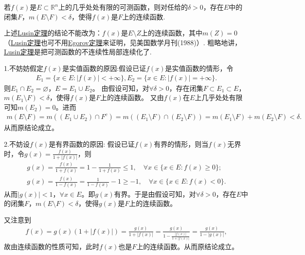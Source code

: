 \documentclass[../../main.tex]{subfiles}
\begin{document}
\begin{theorem}[Lusin(卢津)定理]\label{theorem:Lusin(卢津)定理}
若\(f(x)\)是\(E \subset \mathbb{R}^{n}\)上的几乎处处有限的可测函数，则对任给的\(\delta > 0\)，存在\(E\)中的闭集\(F\)，\(m(E \setminus F) < \delta\)，使得\(f(x)\)是\(F\)上的连续函数.
\end{theorem}
\begin{remark}
上述\hyperref[theorem:Lusin(卢津)定理]{Lusin定理}的结论不能改为：\(f(x)\)是\(E \setminus Z\)上的连续函数，其中\(m(Z) = 0\)（\hyperref[theorem:Lusin(卢津)定理]{Lusin定理}也可不用\hyperref[theorem:Egorov定理]{Egorov定理}来证明，见美国数学月刊(1988)）. 粗略地讲，\hyperref[theorem:Lusin(卢津)定理]{Lusin定理}是把可测函数的不连续性局部连续化了. 
\end{remark}
\begin{remark}
1.\hypertarget{不妨假定f是实值函数的原因}{不妨妨假定}\(f(x)\)是实值函数的原因:假设已证\(f(x)\)是实值函数的情形，令
\begin{align*}
E_1 = \{x \in E : |f(x)| < +\infty\},E_2 = \{x \in E : |f(x)| = +\infty\}.
\end{align*}
则\(E_1 \cap E_2 = \varnothing\)，\(E = E_1 \cup E_2\)。
由假设可知，对\(\forall \delta > 0\)，存在闭集\(F \subset E_1 \subset E\)，\(m(E_1 \setminus F) < \delta\)，使得\(f(x)\)是\(F\)上的连续函数。
又由\(f(x)\)在\(E\)上几乎处处有限可知\(m(E_2) = 0\)。进而
\begin{align*}
m(E \setminus F) = m((E_1 \cup E_2) \cap F^c) 
= m((E_1 \setminus F) \cap (E_2 \setminus F)) 
= m(E_1 \setminus F) + m(E_2 \setminus F) 
< \delta.
\end{align*}
从而原结论成立。

2.\hypertarget{不妨设f有界的原因}{不妨设$f(x)$是有界函数的原因:} 假设已证\(f(x)\)有界的情形，则当\(f(x)\)无界时，令\(g(x) = \frac{f(x)}{1 + |f(x)|}\)，则
\begin{align*}
g(x) = \frac{f(x)}{1 + f(x)} = 1 - \frac{1}{1 + f(x)} \leqslant 1, \quad \forall x \in \{x \in E : f(x) \geqslant 0\}; \\
g(x) = \frac{f(x)}{1 - f(x)} = \frac{1}{1 - f(x)} - 1 \geqslant -1, \quad \forall x \in \{x \in E : f(x) < 0\}.
\end{align*}
从而\(|g(x)| < 1\)，\(\forall x \in E\)。即\(g(x)\)有界。于是由假设可知，对\(\forall \delta > 0\)，存在\(E\)中的闭集\(F\)，\(m(E \setminus F) < \delta\)，使得\(g(x)\)是\(F\)上的连续函数。

又注意到
\begin{align*}
f(x) = g(x)(1 + |f(x)|) = \frac{g(x)}{1 + |f(x)|} = \frac{g(x)}{1 - \frac{|f(x)|}{1 + |f(x)|}} = \frac{g(x)}{1 - |g(x)|},
\end{align*}
故由连续函数的性质可知，此时\(f(x)\)也是\(F\)上的连续函数。从而原结论成立。
\end{remark}
\end{document}

